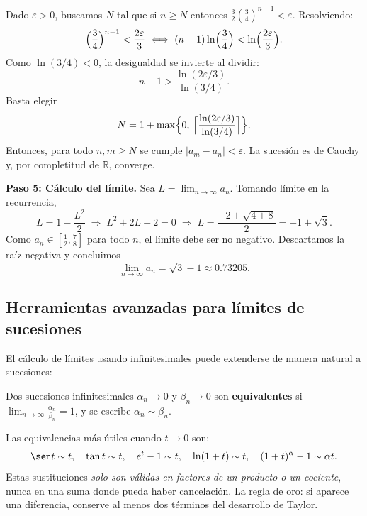 \begin{example}
\begin{myproof}
Dado $\varepsilon > 0$, buscamos $N$ tal que si $n \ge N$ entonces
$\frac{3}{2} (\frac{3}{4})^{n-1} < \varepsilon$. Resolviendo:
\[
\Bigl(\frac{3}{4}\Bigr)^{n-1} < \frac{2\varepsilon}{3}
\;\Longleftrightarrow\;
(n-1)\ln\Bigl(\frac{3}{4}\Bigr) < \ln\Bigl(\frac{2\varepsilon}{3}\Bigr).
\]
Como $\ln(3/4) < 0$, la desigualdad se invierte al dividir:
\[
n-1 > \frac{\ln(2\varepsilon/3)}{\ln(3/4)}.
\]
Basta elegir
\[
N = 1 + \max\Bigl\{ 0,\, \Bigl\lceil \frac{\ln(2\varepsilon/3)}{\ln(3/4)} \Bigr\rceil \Bigr\}.
\]
Entonces, para todo $n,m \ge N$ se cumple $|a_m - a_n| < \varepsilon$.
La sucesión es de Cauchy y, por completitud de $\mathbb{R}$, converge.

\textbf{Paso 5: Cálculo del límite.}
Sea $L = \lim_{n\to\infty} a_n$. Tomando límite en la recurrencia,
\[
L = 1 - \frac{L^2}{2}
\;\Longrightarrow\;
L^2 + 2L - 2 = 0
\;\Longrightarrow\;
L = \frac{-2 \pm \sqrt{4 + 8}}{2} = -1 \pm \sqrt{3}.
\]
Como $a_n \in [\frac{1}{2}, \frac{7}{8}]$ para todo $n$, el límite debe ser no negativo.
Descartamos la raíz negativa y concluimos
\[
\boxed{\lim_{n\to\infty} a_n = \sqrt{3} - 1 \approx 0.73205.}
\]
\end{myproof}
\end{example}

\subsection{Herramientas avanzadas para límites de sucesiones}
El cálculo de límites usando infinitesimales puede extenderse de manera natural a sucesiones:

\begin{definition}
Dos sucesiones infinitesimales $\alpha_n \to 0$ y $\beta_n \to 0$ son
\textbf{equivalentes} si $\displaystyle\lim_{n\to\infty}
\frac{\alpha_n}{\beta_n} = 1$, y se escribe $\alpha_n \sim \beta_n$.
\end{definition}

\begin{rem}
Las equivalencias más útiles cuando $t \to 0$ son:
\[
  \sen t \sim t, \quad \tan t \sim t, \quad e^t - 1 \sim t,
  \quad \ln(1+t) \sim t, \quad (1+t)^\alpha - 1 \sim \alpha t.
\]
Estas sustituciones \emph{solo son válidas en factores de un producto o
un cociente}, nunca en una suma donde pueda haber cancelación. La regla
de oro: si aparece una diferencia, conserve al menos dos términos del
desarrollo de Taylor.
\end{rem}

